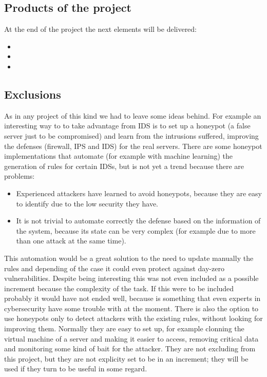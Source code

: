 \subsection{Products of the project}
At the end of the project the next elements will be delivered:
\begin{itemize}
	\item 
	\item 
	\item 
\end{itemize}

\subsection{Exclusions} \label{exclusions} 	%
As in any project of this kind we had to leave some ideas behind.
For example an interesting way to to take advantage from IDS is to set up a honeypot (a false server just to be compromised) and learn from the intrusions suffered, improving the defenses (firewall, IPS and IDS) for the real servers.
\linej
There are some honeypot implementations that automate (for example with machine learning) the generation of rules for certain IDSs, but is not yet a trend because there are problems\cite{snort_learning}\cite{honeypot_weka_learning}\cite{honeypot_ossec_trees}\cite{snort_honeypot}:
\begin{itemize}
	\item Experienced attackers have learned to avoid honeypots, because they are easy to identify due to the low security they have.
	\item It is not trivial to automate correctly the defense based on the information of the system, because its state can be very complex (for example due to more than one attack at the same time).
\end{itemize}
\linej
This automation would be a great solution to the need to update manually the rules and depending of the case it could even protect against day-zero vulnerabilities. Despite being interesting this was not even included as a possible increment because the complexity of the task.
If this were to be included probably it would have not ended well, because is something that even experts in cybersecurity have some trouble with at the moment.
\linej
There is also the option to use honeypots only to detect attackers with the existing rules, without looking for improving them. Normally they are easy to set up, for example clonning the virtual machine of a server and making it easier to access, removing critical data and monitoring some kind of bait for the attacker. They are not excluding from this project, but they are not explicity set to be in an increment; they will be used if they turn to be useful in some regard.

